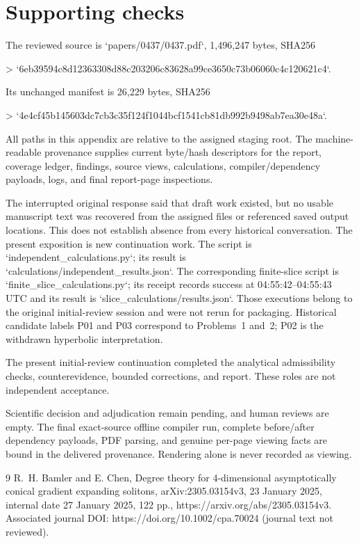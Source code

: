 \documentclass[10pt]{article}
\begin{document}
\section*{Supporting checks}
The reviewed source is `papers/0437/0437.pdf`, 1,496,247 bytes, SHA256\par
> `6eb39594c8d12363308d88c203206c83628a99ce3650c73b06060c4c120621c4`.\par
Its unchanged manifest is 26,229 bytes, SHA256\par
> `4e4cf45b145603dc7cb3c35f124f1044bcf1541cb81db992b9498ab7ea30e48a`.\par
All paths in this appendix are relative to the assigned staging root. The machine-readable provenance supplies current byte/hash descriptors for the report, coverage ledger, findings, source views, calculations, compiler/dependency payloads, logs, and final report-page inspections.\par
The interrupted original response said that draft work existed, but no usable manuscript text was recovered from the assigned files or referenced saved output locations. This does not establish absence from every historical conversation. The present exposition is new continuation work. The script is `independent\_calculations.py`; its result is `calculations/independent\_results.json`. The corresponding finite-slice script is `finite\_slice\_calculations.py`; its receipt records success at 04:55:42–04:55:43 UTC and its result is `slice\_calculations/results.json`. Those executions belong to the original initial-review session and were not rerun for packaging. Historical candidate labels P01 and P03 correspond to Problems 1 and 2; P02 is the withdrawn hyperbolic interpretation.\par
The present initial-review continuation completed the analytical admissibility checks, counterevidence, bounded corrections, and report. These roles are not independent acceptance.\par
Scientific decision and adjudication remain pending, and human reviews are empty. The final exact-source offline compiler run, complete before/after dependency payloads, PDF parsing, and genuine per-page viewing facts are bound in the delivered provenance. Rendering alone is never recorded as viewing.\par
9 R. H. Bamler and E. Chen, Degree theory for 4-dimensional asymptotically conical gradient expanding solitons, arXiv:2305.03154v3, 23 January 2025, internal date 27 January 2025, 122 pp., https://arxiv.org/abs/2305.03154v3. Associated journal DOI: https://doi.org/10.1002/cpa.70024 (journal text not reviewed).\par
\end{document}
